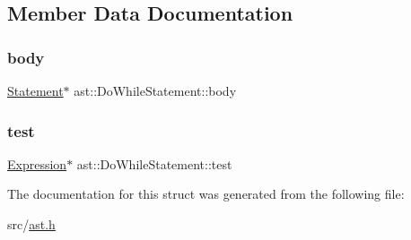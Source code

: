\subsection{Member Data Documentation}
\mbox{\label{structast_1_1_do_while_statement_a7d1d10fa21fefab6f9ca82a7c88c7986}} 
\subsubsection{\texorpdfstring{body}{body}}
{\footnotesize\ttfamily \hyperlink{structast_1_1_statement}{Statement}$\ast$ ast\+::\+Do\+While\+Statement\+::body}

\mbox{\label{structast_1_1_do_while_statement_a9191ed1c7a07db01694873c22e96f32c}} 
\subsubsection{\texorpdfstring{test}{test}}
{\footnotesize\ttfamily \hyperlink{structast_1_1_expression}{Expression}$\ast$ ast\+::\+Do\+While\+Statement\+::test}



The documentation for this struct was generated from the following file\+:\begin{DoxyCompactItemize}
\item 
src/\hyperlink{ast_8h}{ast.\+h}\end{DoxyCompactItemize}
